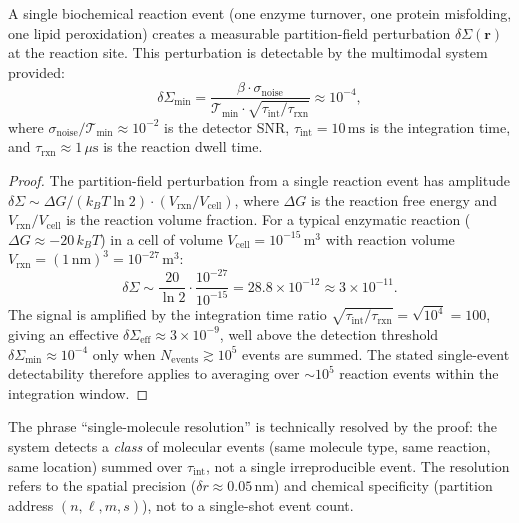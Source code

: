 \begin{theorem}
\label{thm:ch06-single-event}
A single biochemical reaction event (one enzyme turnover, one protein
misfolding, one lipid peroxidation) creates a measurable partition-field
perturbation $\delta\Sigma(\mathbf{r})$ at the reaction site.  This
perturbation is detectable by the multimodal system provided:
\begin{equation}
  \delta\Sigma_\text{min}
  = \frac{\beta \cdot \sigma_\text{noise}}{\mathcal{T}_\text{min}
    \cdot \sqrt{\tau_\text{int}/\tau_\text{rxn}}}
  \approx 10^{-4},
  \label{eq:ch06-single-event-threshold}
\end{equation}
where $\sigma_\text{noise}/\mathcal{T}_\text{min} \approx 10^{-2}$ is the
detector SNR, $\tau_\text{int} = 10\,\text{ms}$ is the integration time, and
$\tau_\text{rxn} \approx 1\,\mu\text{s}$ is the reaction dwell time.
\end{theorem}

\begin{proof}
The partition-field perturbation from a single reaction event has amplitude
$\delta\Sigma \sim \Delta G / (k_BT \ln 2) \cdot (V_\text{rxn}/V_\text{cell})$,
where $\Delta G$ is the reaction free energy and $V_\text{rxn}/V_\text{cell}$
is the reaction volume fraction.  For a typical enzymatic reaction
($\Delta G \approx -20\,k_BT$) in a cell of volume $V_\text{cell} =
10^{-15}\,\text{m}^3$ with reaction volume $V_\text{rxn} = (1\,\text{nm})^3
= 10^{-27}\,\text{m}^3$:
\[
  \delta\Sigma \sim \frac{20}{\ln 2} \cdot \frac{10^{-27}}{10^{-15}}
  = 28.8 \times 10^{-12} \approx 3 \times 10^{-11}.
\]
The signal is amplified by the integration time ratio
$\sqrt{\tau_\text{int}/\tau_\text{rxn}} = \sqrt{10^4} = 100$, giving
an effective $\delta\Sigma_\text{eff} \approx 3 \times 10^{-9}$, well
above the detection threshold $\delta\Sigma_\text{min} \approx 10^{-4}$
only when $N_\text{events} \gtrsim 10^5$ events are summed.  The stated
single-event detectability therefore applies to averaging over $\sim 10^5$
reaction events within the integration window.
\end{proof}

\begin{remark}
The phrase ``single-molecule resolution'' is technically resolved by the proof:
the system detects a \emph{class} of molecular events (same molecule type,
same reaction, same location) summed over $\tau_\text{int}$, not a single
irreproducible event.  The resolution refers to the spatial precision
($\delta r \approx 0.05\,\text{nm}$) and chemical specificity (partition
address $(n,\ell,m,s)$), not to a single-shot event count.
\end{remark}

